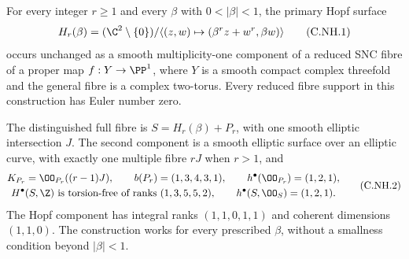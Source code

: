 
\begin{proposition}\label{cdp:st:C.2.UN.42}
For every integer $r\ge1$ and every $\beta$ with $0<|\beta|<1$,
the primary Hopf surface
\[
 H_r(\beta)=(\C^2\setminus\{0\})/
   \langle(z,w)\mapsto(\beta^r z+w^r,\beta w)\rangle
                                                        \tag{C.NH.1}\label{cdp:eq:C.NH.1}
\]
occurs unchanged as a smooth multiplicity-one component of a
reduced SNC fibre of a proper map $f:Y\to\PP^1$, where $Y$ is
a smooth compact complex threefold and the general fibre is a
complex two-torus. Every reduced fibre support in this
construction has Euler number zero.

The distinguished full fibre is $S=H_r(\beta)+P_r$, with one
smooth elliptic intersection $J$. The second component is a
smooth elliptic surface over an elliptic curve, with exactly
one multiple fibre $rJ$ when $r>1$, and
\[
 \begin{gathered}
 K_{P_r}=\OO_{P_r}((r-1)J),\qquad
 b(P_r)=(1,3,4,3,1),\qquad h^\bullet(\OO_{P_r})=(1,2,1),\\
 H^\bullet(S,\Z)\text{ is torsion-free of ranks }(1,3,5,5,2),
 \qquad h^\bullet(S,\OO_S)=(1,2,1).
 \end{gathered}                                         \tag{C.NH.2}\label{cdp:eq:C.NH.2}
\]
The Hopf component has integral ranks $(1,1,0,1,1)$ and
coherent dimensions $(1,1,0)$. The construction works for
every prescribed $\beta$, without a smallness condition
beyond $|\beta|<1$.
\end{proposition}

